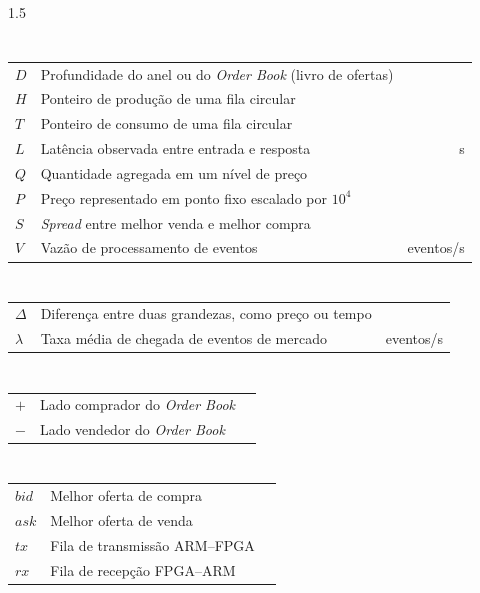 
\listadesimbolos

\begin{Spacing}{1.5}
\section*{\nomeletraslatinas}
\begin{tabularx}{\textwidth}{@{}lXr@{}}
$D$ & Profundidade do anel ou do \textit{Order Book} (livro de ofertas) & \\
$H$ & Ponteiro de produção de uma fila circular & \\
$T$ & Ponteiro de consumo de uma fila circular & \\
$L$ & Latência observada entre entrada e resposta & s \\
$Q$ & Quantidade agregada em um nível de preço & \\
$P$ & Preço representado em ponto fixo escalado por $10^4$ & \\
$S$ & \textit{Spread} entre melhor venda e melhor compra & \\
$V$ & Vazão de processamento de eventos & eventos/s \\
\end{tabularx}

\section*{\nomeletrasgregas}
\begin{tabularx}{\textwidth}{@{}lXr@{}}
$\Delta$ & Diferença entre duas grandezas, como preço ou tempo & \\
$\lambda$ & Taxa média de chegada de eventos de mercado & eventos/s \\
\end{tabularx}

\section*{\nomesobrescritos}
\begin{tabularx}{\textwidth}{@{}lXr@{}}
$+$ & Lado comprador do \textit{Order Book} & \\
$-$ & Lado vendedor do \textit{Order Book} & \\
\end{tabularx}

\section*{\nomesubscritos}
\begin{tabularx}{\textwidth}{@{}lXr@{}}
$bid$ & Melhor oferta de compra & \\
$ask$ & Melhor oferta de venda & \\
$tx$ & Fila de transmissão ARM--FPGA & \\
$rx$ & Fila de recepção FPGA--ARM & \\
\end{tabularx}


\end{Spacing}

